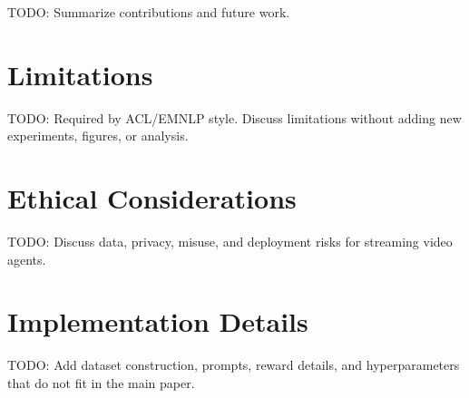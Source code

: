 \documentclass[11pt]{article}
\begin{document}
TODO: Summarize contributions and future work.

\section*{Limitations}

TODO: Required by ACL/EMNLP style. Discuss limitations without adding new experiments, figures, or analysis.

\section*{Ethical Considerations}

TODO: Discuss data, privacy, misuse, and deployment risks for streaming video agents.



\appendix

\section{Implementation Details}

TODO: Add dataset construction, prompts, reward details, and hyperparameters that do not fit in the main paper.
\end{document}
